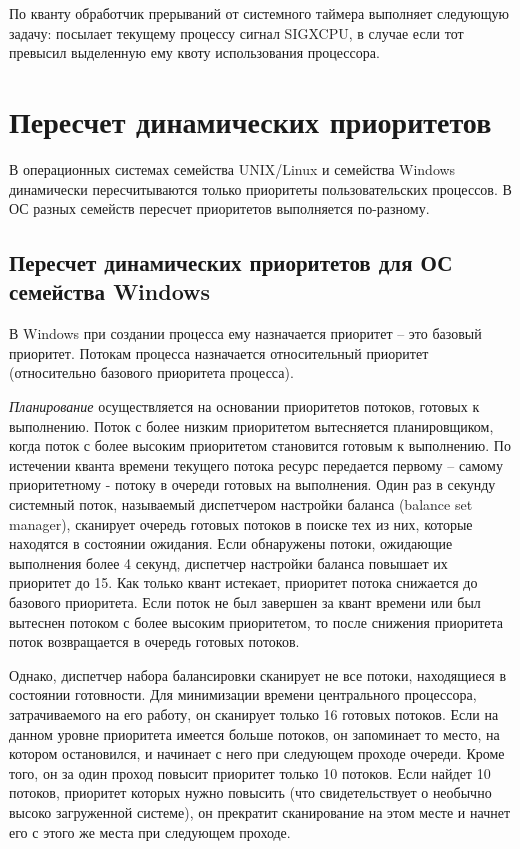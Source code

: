 \documentclass[12pt]{report}
\begin{document}
По кванту обработчик прерываний от системного таймера выполняет следующую задачу: посылает текущему процессу сигнал SIGXCPU, в случае если тот превысил выделенную ему квоту использования процессора.

\chapter{Пересчет динамических приоритетов}

В операционных системах семейства UNIX/Linux и семейства Windows динамически пересчитываются только приоритеты пользовательских процессов. В ОС разных семейств пересчет приоритетов выполняется по-разному.

\section{Пересчет динамических приоритетов для ОС семейства Windows}

В Windows при создании процесса ему назначается приоритет – это базовый приоритет. Потокам процесса назначается относительный приоритет (относительно базового приоритета процесса). 

\textit{Планирование} осуществляется на основании приоритетов потоков, готовых к выполнению. Поток с более низким приоритетом вытесняется планировщиком, когда поток с более высоким приоритетом становится готовым к выполнению. По истечении кванта времени текущего потока ресурс передается первому – самому приоритетному - потоку в очереди готовых на выполнения. 
Один раз в секунду системный поток, называемый диспетчером настройки баланса (balance set manager), сканирует очередь готовых потоков в поиске тех из них, которые находятся в состоянии ожидания. Если обнаружены потоки, ожидающие выполнения более 4 секунд, диспетчер настройки баланса повышает их приоритет до 15. Как только квант истекает, приоритет потока снижается до базового приоритета. Если поток не был завершен за квант времени или был вытеснен потоком с более высоким приоритетом, то после снижения приоритета поток возвращается в очередь готовых потоков.

Однако, диспетчер набора балансировки сканирует не все потоки, находящиеся в состоянии готовности. Для минимизации времени центрального процессора, затрачиваемого на его работу, он сканирует только 16 готовых потоков. Если на данном уровне приоритета имеется больше потоков, он запоминает то место, на котором остановился, и начинает с него при следующем проходе очереди. Кроме того, он за один проход повысит приоритет только 10 потоков. Если найдет 10 потоков, приоритет которых нужно повысить (что свидетельствует о необычно высоко загруженной системе), он прекратит сканирование на этом месте и начнет его с этого же места при следующем проходе.
\end{document}
